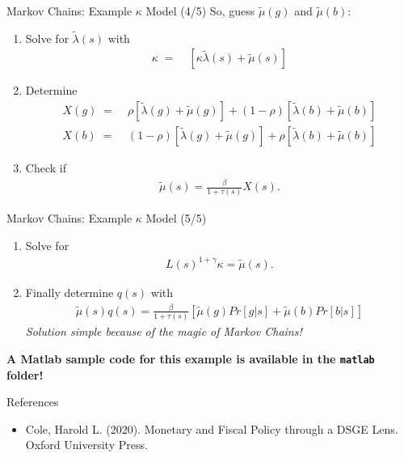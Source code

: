 \documentclass[10pt,c,aspectratio=1610,handout]{beamer}
\begin{document}
\begin{frame}{Markov Chains: Example $\kappa$ Model (4/5)}%
  So, guess $\tilde{\mu}(g)$ and $\tilde{\mu}(b)$:%
  \medskip%
  \pause%
  \begin{enumerate}%
    \item Solve for $\tilde{\lambda}(s)$ with%
    \begin{align*}%
      \kappa \; = & \; \left[\kappa  \tilde{\lambda} (s)+\tilde{\mu} (s)\right]%
    \end{align*}%
    \pause%
    \item Determine%
    \begin{align*}%
      X(g) \; = & \; \rho [ \tilde{\lambda} (g)+ \tilde{\mu} (g)  ] +  (1-\rho)[ \tilde{\lambda} (b)+ \tilde{\mu} (b)  ] \\%
      X(b) \; = & \; (1-\rho) [ \tilde{\lambda} (g)+ \tilde{\mu} (g)  ] +  \rho[ \tilde{\lambda} (b)+ \tilde{\mu} (b)  ]%
    \end{align*}%
    \pause%
    \item Check if%
    \begin{align*}%
      \tilde{\mu} (s)= \frac{\beta}{1+\tau(s)} X(s).%
    \end{align*}%
  \end{enumerate}%
\end{frame}%
\begin{frame}{Markov Chains: Example $\kappa$ Model (5/5)}%
  \begin{enumerate}%
    \item[4.] Solve for%
      \begin{align*}%
        L(s)^{1+\gamma} \kappa = \tilde{\mu} (s).%
      \end{align*}%
      \pause%
      \item[5.] Finally determine $q(s)$ with%
      \begin{align*}%
        \tilde{\mu} (s)q(s)= \frac{\beta}{1+\tau(s)} [\tilde{\mu}(g)Pr[g|s] + \tilde{\mu}(b)Pr[b|s] ]%
      \end{align*}%
      \textit{Solution simple because of the magic of Markov Chains!}%
  \end{enumerate}%
  \vspace*{0.2in}%
  \pause%
  \begin{center}%
    \textbf{A Matlab sample code for this example is available in the \texttt{matlab} folder!}%
  \end{center}%
\end{frame}%
\begin{frame}{References}%
  \begin{itemize}%
    \item[$\blacktriangleright$] Cole, Harold L. (2020). Monetary and Fiscal Policy through a DSGE Lens. Oxford University Press.%
  \end{itemize}%
\end{frame}%
\end{document}
